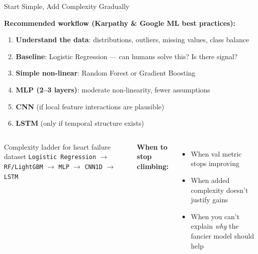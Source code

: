 \documentclass[aspectratio=169]{beamer}
\begin{document}
\begin{frame}{Start Simple, Add Complexity Gradually}

\textbf{Recommended workflow (Karpathy \& Google ML best practices):}

\vspace{0.3cm}
\begin{enumerate}
    \item \textbf{Understand the data}: distributions, outliers, missing values, class balance
    \item \textbf{Baseline}: Logistic Regression --- can humans solve this? Is there signal?
    \item \textbf{Simple non-linear}: Random Forest or Gradient Boosting
    \item \textbf{MLP (2--3 layers)}: moderate non-linearity, fewer assumptions
    \item \textbf{CNN} (if local feature interactions are plausible)
    \item \textbf{LSTM} (only if temporal structure exists)
\end{enumerate}

\vspace{0.3cm}
\begin{columns}
\begin{block}{Complexity ladder for heart failure dataset}
\texttt{Logistic Regression} $\to$ \texttt{RF/LightGBM} $\to$ \texttt{MLP} $\to$ \texttt{CNN1D} $\to$ \texttt{LSTM}
\end{block}

\textbf{When to stop climbing:}
\begin{itemize}
    \item When val metric stops improving
    \item When added complexity doesn't justify gains
    \item When you can't explain \emph{why} the fancier model should help
\end{itemize}
\end{columns}
\end{frame}

\end{document}
